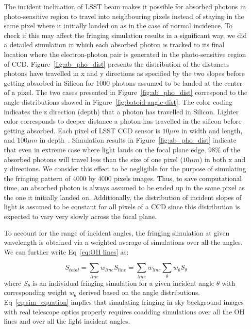 \documentclass[twocolumn]{aastex63} %
\begin{document}
\begin{CJK*}{UTF8}{gbsn}
The incident inclination of LSST beam makes it possible for absorbed photons in photo-sensitive region to travel into neighbouring pixels instead of staying in the same pixel where it initially landed on as in the case of normal incidence. To check if this may affect the fringing simulation results in a significant way, we did a detailed simulation in which each absorbed photon is tracked to its final location where the electron-photon pair is generated in the photo-sensitive region of CCD. Figure~\ref{fig:ab_pho_dist} presents the distribution of the distances photons have travelled in x and y directions as specified by the two slopes before getting absorbed in Silicon for 1000 photons assumed to be landed at the center of a pixel.  The two cases presented in Figure~\ref{fig:ab_pho_dist} correspond to the angle distributions showed in Figure~\ref{fig:batoid-angle-dist}. The color coding indicates the z direction (depth) that a photon has travelled in Silicon. Lighter color corresponds to deeper distance a photon has travelled in the silicon before getting absorbed. Each pixel of LSST CCD sensor is $10\mu m$ in width and length, and $100\mu m$ in depth~\citep{Ivezi19}. Simulation results in Figure~\ref{fig:ab_pho_dist} indicate that even in extreme case where light lands on the focal plane edge, $98\%$ of the absorbed photons will travel less than the size of one pixel ($10 \mu m$) in both x and y directions. We consider this effect to be negligible for the purpose of simulating the fringing pattern of 4000 by 4000 pixels images. Thus, to save computational time, an absorbed photon is always assumed to be ended up in the same pixel as the one it initially landed on. Additionally, the distribution of incident slopes of light is assumed to be constant for all pixels of a CCD since this distribution is expected to vary very slowly across the focal plane.

To account for the range of incident angles, the fringing simulation at given wavelength is obtained via a weighted average of simulations over all the angles. We can further write Eq~\ref{eq:OH lines} as:

\begin{equation} \label{eq:sim_equation}
    S_{total} = \sum_{line}w_{line} S_{line} = \sum_{line}w_{line}\sum_{\theta}w_{\theta}S_{\theta}
\end{equation}
where $S_\theta$ is an individual fringing simulation for a given incident angle $\theta$ with corresponding weight $w_\theta$ derived based on the angle distributions.  Eq~\ref{eq:sim_equation} implies that simulating fringing in sky background images with real telescope optics properly requires coadding simulations over all the OH lines and over all the light incident angles.


\end{CJK*}
\end{document}
